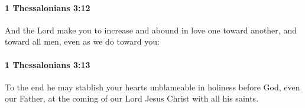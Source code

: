 		\paragraph{1 Thessalonians 3:12} %
			\label{1THESSALONIANS-3-12}

			And the Lord make you to increase and abound in love one toward another, and toward all men, even as we do toward you:

			\begin{framed}
			\scriptsize
				\begin{compactdesc}
					\item[SBLG] 
				\end{compactdesc}
			\end{framed}

		\paragraph{1 Thessalonians 3:13} %
			\label{1THESSALONIANS-3-13}

			To the end he may stablish your hearts unblameable in holiness before God, even our Father, at the coming of our Lord Jesus Christ with all his saints.

